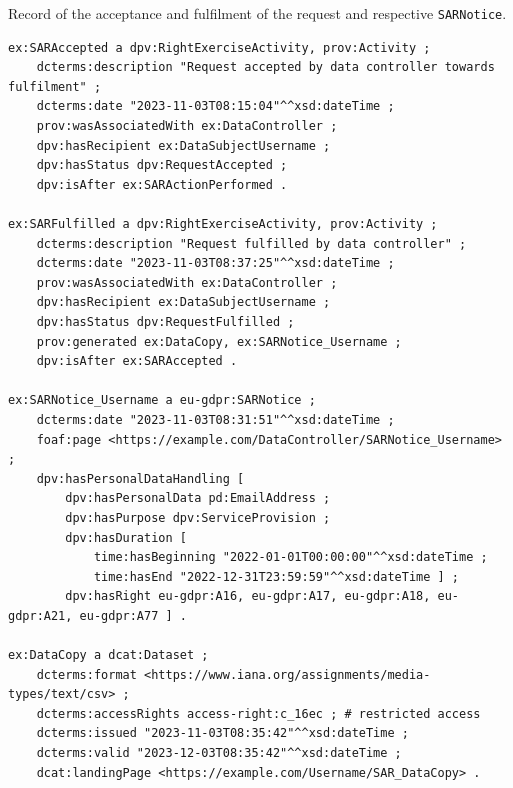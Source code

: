 \begin{listing}[htp]
\caption[Record of the acceptance and fulfilment of a SAR request.]{Record of the acceptance and fulfilment of the request and respective \texttt{SARNotice}.}
\label{list:sar_notice}
\begin{verbatim}
ex:SARAccepted a dpv:RightExerciseActivity, prov:Activity ;
    dcterms:description "Request accepted by data controller towards fulfilment" ;
    dcterms:date "2023-11-03T08:15:04"^^xsd:dateTime ;
    prov:wasAssociatedWith ex:DataController ;
    dpv:hasRecipient ex:DataSubjectUsername ;
    dpv:hasStatus dpv:RequestAccepted ;
    dpv:isAfter ex:SARActionPerformed .

ex:SARFulfilled a dpv:RightExerciseActivity, prov:Activity ;
    dcterms:description "Request fulfilled by data controller" ;
    dcterms:date "2023-11-03T08:37:25"^^xsd:dateTime ;
    prov:wasAssociatedWith ex:DataController ;
    dpv:hasRecipient ex:DataSubjectUsername ;
    dpv:hasStatus dpv:RequestFulfilled ;
    prov:generated ex:DataCopy, ex:SARNotice_Username ;
    dpv:isAfter ex:SARAccepted .

ex:SARNotice_Username a eu-gdpr:SARNotice ;
    dcterms:date "2023-11-03T08:31:51"^^xsd:dateTime ;
    foaf:page <https://example.com/DataController/SARNotice_Username> ;
    dpv:hasPersonalDataHandling [
        dpv:hasPersonalData pd:EmailAddress ;
        dpv:hasPurpose dpv:ServiceProvision ;
        dpv:hasDuration [
            time:hasBeginning "2022-01-01T00:00:00"^^xsd:dateTime ;
            time:hasEnd "2022-12-31T23:59:59"^^xsd:dateTime ] ;
        dpv:hasRight eu-gdpr:A16, eu-gdpr:A17, eu-gdpr:A18, eu-gdpr:A21, eu-gdpr:A77 ] .

ex:DataCopy a dcat:Dataset ;
    dcterms:format <https://www.iana.org/assignments/media-types/text/csv> ;
    dcterms:accessRights access-right:c_16ec ; # restricted access
    dcterms:issued "2023-11-03T08:35:42"^^xsd:dateTime ;
    dcterms:valid "2023-12-03T08:35:42"^^xsd:dateTime ;
    dcat:landingPage <https://example.com/Username/SAR_DataCopy> .
\end{verbatim}
\end{listing}

